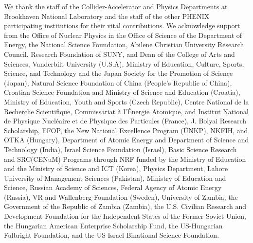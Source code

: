 \documentclass[twocolumn,letterpaper,aps,prl,longbibliography,superscriptaddress,floatfix]{revtex4-2}
\begin{document}


We thank the staff of the Collider-Accelerator and Physics
Departments at Brookhaven National Laboratory and the staff of
the other PHENIX participating institutions for their vital
contributions.  
We acknowledge support from the Office of Nuclear Physics in the
Office of Science of the Department of Energy,
the National Science Foundation,
Abilene Christian University Research Council,
Research Foundation of SUNY, and
Dean of the College of Arts and Sciences, Vanderbilt University
(U.S.A),
Ministry of Education, Culture, Sports, Science, and Technology
and the Japan Society for the Promotion of Science (Japan),
Natural Science Foundation of China (People's Republic of China),
Croatian Science Foundation and
Ministry of Science and Education (Croatia),
Ministry of Education, Youth and Sports (Czech Republic),
Centre National de la Recherche Scientifique, Commissariat
{\`a} l'{\'E}nergie Atomique, and Institut National de Physique
Nucl{\'e}aire et de Physique des Particules (France),
J. Bolyai Research Scholarship, EFOP, the New National Excellence
Program ({\'U}NKP), NKFIH, and OTKA (Hungary),
Department of Atomic Energy and Department of Science and Technology
(India),
Israel Science Foundation (Israel),
Basic Science Research and SRC(CENuM) Programs through NRF
funded by the Ministry of Education and the Ministry of
Science and ICT (Korea),
Physics Department, Lahore University of Management Sciences (Pakistan),
Ministry of Education and Science, Russian Academy of Sciences,
Federal Agency of Atomic Energy (Russia),
VR and Wallenberg Foundation (Sweden),
University of Zambia, the Government of the Republic of Zambia (Zambia),
the U.S. Civilian Research and Development Foundation for the
Independent States of the Former Soviet Union,
the Hungarian American Enterprise Scholarship Fund,
the US-Hungarian Fulbright Foundation,
and the US-Israel Binational Science Foundation.


\end{document}
